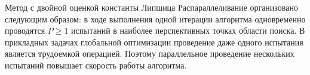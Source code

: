 \documentclass{beamer}
\begin{document}
\begin{frame}[t]
\begin{columns}[t]
\begin{column}[t]{0.465\paperwidth}
\begin{block}{Метод с  двойной оценкой константы Липшица}
Распараллеливание организовано следующим образом: в ходе выполнения одной итерации алгоритма одновременно проводятся \(P \geq 1\) испытаний в наиболее перспективных точках области поиска. В прикладных задачах глобальной оптимизации проведение даже одного испытания является трудоемкой операцией. Поэтому параллельное проведение нескольких испытаний повышает скорость работы алгоритма. 

\leftskip=0.001cm 
\setlength{\parindent}{0.001cm}
 \begin{minipage}[t]{0.96\textwidth}
              \begin{figure}
              \end{figure}
              \end{minipage}
\end{block}
            

\end{column}
\end{columns}
\end{frame}
\end{document}

